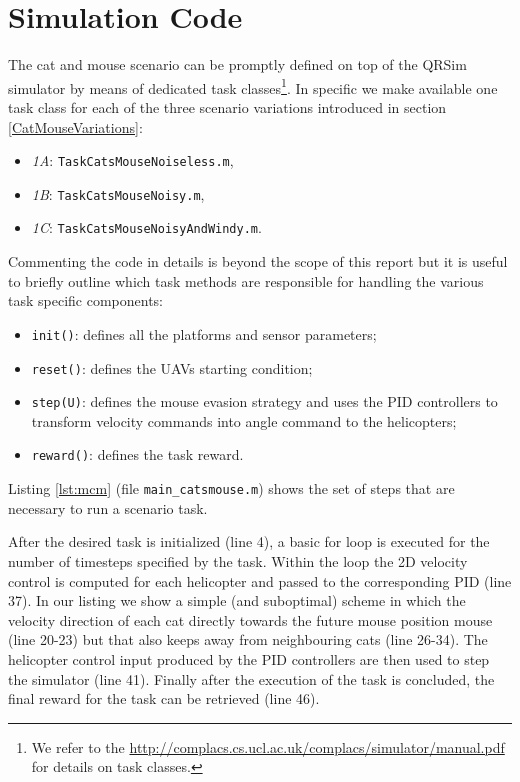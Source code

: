\documentclass[a4paper,11pt]{report}
\newcommand{\sname}{QRSim\xspace}
\newcommand{\webman}{\url{http://complacs.cs.ucl.ac.uk/complacs/simulator/manual.pdf}\xspace}
\newcommand\mytexttt[1]{\texttt{\hyphenchar\font=45\relax #1}}
\begin{document}
\section{Simulation Code}\label{CatMouseSim}
The cat and mouse scenario can be promptly defined on top of the \sname simulator by means of dedicated task classes\footnote{We refer to the \webman for details on task classes.}. In specific we make available one task class for each of the three scenario variations introduced in section \ref{CatMouseVariations}:
\begin{itemize}
\item\textit{1A}: \mytexttt{TaskCatsMouseNoiseless.m},
\item\textit{1B}: \mytexttt{TaskCatsMouseNoisy.m},
\item\textit{1C}: \mytexttt{TaskCatsMouseNoisyAndWindy.m}. 
\end{itemize}

Commenting the code in details is beyond the scope of this report but it is useful to briefly outline which task methods are responsible for handling the various task specific components:
\begin{itemize}
\item\mytexttt{init()}: defines all the platforms and sensor parameters;
\item\mytexttt{reset()}: defines the UAVs starting condition;
\item\mytexttt{step(U)}: defines the mouse evasion strategy and uses the PID controllers to transform velocity commands into angle command to the helicopters;
\item\mytexttt{reward()}: defines the task reward.
\end{itemize}

Listing \ref{lst:mcm} (file \texttt{main\_catsmouse.m}) shows the set of steps that are necessary to run a scenario task.

After the desired task is initialized (line 4), a basic for loop is executed for the number of timesteps specified by the task. Within the loop the 2D velocity control is computed for each helicopter and passed to the corresponding PID (line 37). 
In our listing we show a simple (and suboptimal) scheme in which the velocity direction of each cat directly towards the future mouse position mouse (line 20-23) but that also keeps away from neighbouring cats (line 26-34). 
The helicopter control input produced by the PID controllers are then used to step the simulator (line 41).
Finally after the execution of the task is concluded, the final reward for the task can be retrieved (line 46).
\end{document}
